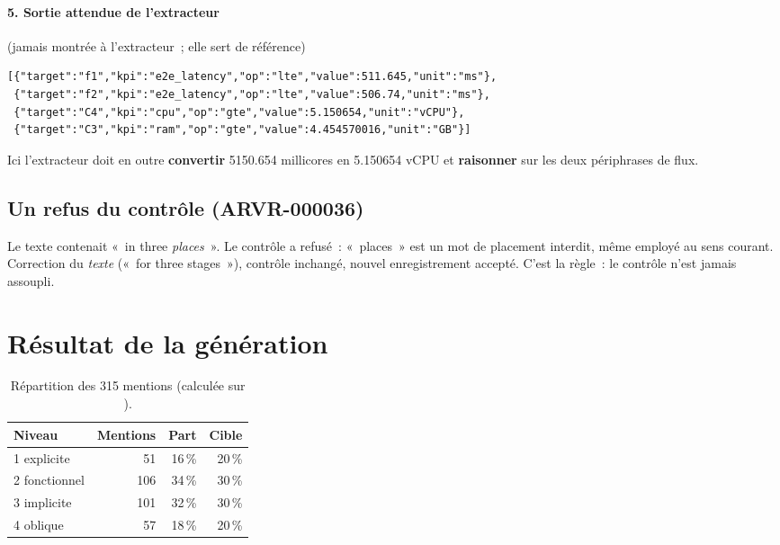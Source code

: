 \documentclass[11pt,a4paper]{article}
\newcommand{\code}[1]{\texttt{\detokenize{#1}}}
\begin{document}
\paragraph{5. Sortie attendue de l'extracteur} (jamais montrée à l'extracteur~; elle sert de référence)
\begin{lstlisting}
[{"target":"f1","kpi":"e2e_latency","op":"lte","value":511.645,"unit":"ms"},
 {"target":"f2","kpi":"e2e_latency","op":"lte","value":506.74,"unit":"ms"},
 {"target":"C4","kpi":"cpu","op":"gte","value":5.150654,"unit":"vCPU"},
 {"target":"C3","kpi":"ram","op":"gte","value":4.454570016,"unit":"GB"}]
\end{lstlisting}
Ici l'extracteur doit en outre \textbf{convertir} 5150.654 millicores en 5.150654 vCPU et \textbf{raisonner} sur les deux périphrases de flux.

\subsection{Un refus du contrôle (ARVR-000036)}

Le texte contenait «~in three \emph{places}~». Le contrôle a refusé~: «~places~» est un mot de placement interdit, même employé au sens courant. Correction du \emph{texte} («~for three stages~»), contrôle inchangé, nouvel enregistrement accepté. C'est la règle~: le contrôle n'est jamais assoupli.

\section{Résultat de la génération}

\begin{table}[h]
\centering
\caption{Répartition des 315 mentions (calculée sur \code{intents.json}).}
\small
\begin{tabular}{@{}lrrr@{}}
\toprule
Niveau & Mentions & Part & Cible \\
\midrule
1 explicite & 51 & 16\,\% & 20\,\% \\
2 fonctionnel & 106 & 34\,\% & 30\,\% \\
3 implicite & 101 & 32\,\% & 30\,\% \\
4 oblique & 57 & 18\,\% & 20\,\% \\
\bottomrule
\end{tabular}
\end{table}
\end{document}
